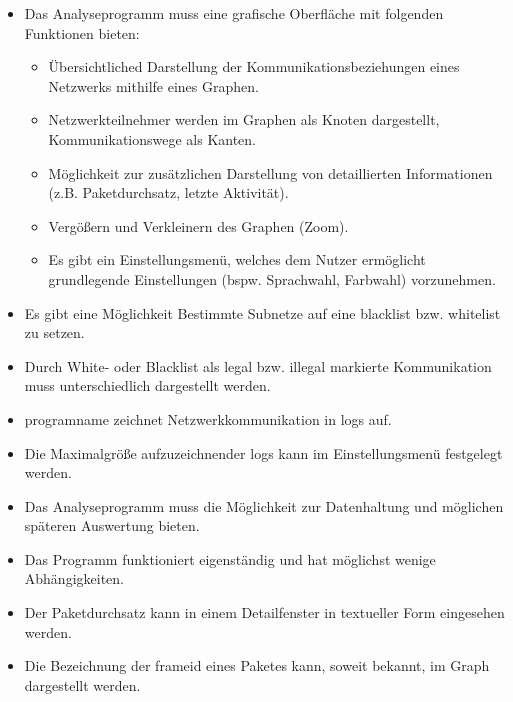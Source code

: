\begin{itemize}
\item Das Analyseprogramm muss eine grafische Oberfläche mit folgenden Funktionen bieten:

	\begin{itemize}
    \item Übersichtliched Darstellung der Kommunikationsbeziehungen eines Netzwerks mithilfe eines Graphen.

    \item Netzwerkteilnehmer werden im Graphen als Knoten dargestellt, Kommunikationswege als Kanten.

    \item Möglichkeit zur zusätzlichen Darstellung von detaillierten Informationen (z.B. Paketdurchsatz, letzte Aktivität).

    \item Vergößern und Verkleinern des Graphen (Zoom).

    \item Es gibt ein Einstellungsmenü, welches dem Nutzer ermöglicht grundlegende Einstellungen (bspw. Sprachwahl, Farbwahl) vorzunehmen.
    \end{itemize}

\item Es gibt eine Möglichkeit Bestimmte Subnetze auf eine \gls{blacklist} bzw. \gls{whitelist} zu setzen.

\item Durch White- oder Blacklist als legal bzw. illegal markierte Kommunikation muss unterschiedlich dargestellt werden.

\item \gls{programname} zeichnet Netzwerkkommunikation in \glspl{log} auf.

\item Die Maximalgröße aufzuzeichnender \glspl{log} kann im Einstellungsmenü festgelegt werden.

\item Das Analyseprogramm muss die Möglichkeit zur Datenhaltung und möglichen späteren Auswertung bieten.

\item Das Programm funktioniert eigenständig und hat möglichst wenige Abhängigkeiten.

\item Der Paketdurchsatz kann in einem Detailfenster in textueller Form eingesehen werden.

\item Die Bezeichnung der \gls{frameid} eines Paketes kann, soweit bekannt, im Graph dargestellt werden.

\end{itemize}

